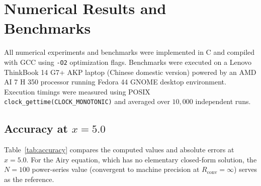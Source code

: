 \documentclass[12pt,a4paper]{article}
\theoremstyle{definition}
\theoremstyle{remark}
\newcommand{\Rconv}{R_{\mathrm{conv}}}
\begin{document}
\section{Numerical Results and Benchmarks}
\label{sec:results}

All numerical experiments and benchmarks were implemented in C and compiled with GCC using \texttt{-O2} optimization flags. Benchmarks were executed on a Lenovo ThinkBook 14 G7+ AKP laptop (Chinese domestic version) powered by an AMD AI 7 H 350 processor running Fedora 44 GNOME desktop environment. Execution timings were measured using POSIX \texttt{clock\_gettime(CLOCK\_MONOTONIC)} and averaged over $10{,}000$ independent runs.

\subsection{Accuracy at \texorpdfstring{$x = 5.0$}{x = 5.0}}

Table~\ref{tab:accuracy} compares the computed values and absolute
errors at $x = 5.0$.  For the Airy equation, which has no elementary
closed-form solution, the $N = 100$ power-series value
(convergent to machine precision at $\Rconv = \infty$) serves as the
reference.
\end{document}
